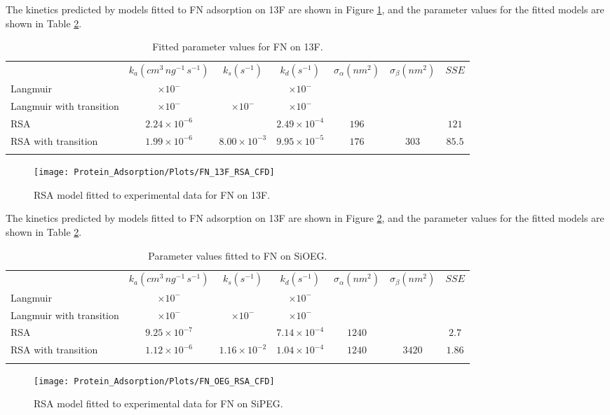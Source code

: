 The kinetics predicted by models fitted to FN adsorption on 13F are
shown in Figure \ref{fig:FN 13F fitted}, and the parameter values
for the fitted models are shown in Table \ref{tab:FN OEG fitted params}.%
\begin{table}
\caption{\label{tab:FN on 13F}Fitted parameter values for FN on 13F.}
\begin{tabular}{>{\raggedright}p{0.75in}cccccc}
 & $k_{a}\left(cm^{3}\, ng^{-1}\, s^{-1}\right)$ & $k_{s}\left(s^{-1}\right)$ & $k_{d}\left(s^{-1}\right)$ & $\sigma_{\alpha}\left(nm^{2}\right)$ & $\sigma_{\beta}\left(nm^{2}\right)$ & $SSE$\tabularnewline[\doublerulesep]
\cline{2-7} 
\noalign{\vskip\doublerulesep}
Langmuir & $\times10^{-}$ &  & $\times10^{-}$ & $ $ &  & $ $\tabularnewline
Langmuir with transition & $\times10^{-}$ & $\times10^{-}$ & $\times10^{-}$ & $ $ & $ $ & $ $\tabularnewline
\noalign{\vskip\doublerulesep}
RSA & $2.24\times10^{-6}$ &  & $2.49\times10^{-4}$ & $196$ &  & $121$\tabularnewline
\noalign{\vskip\doublerulesep}
RSA with transition & $1.99\times10^{-6}$ & $8.00\times10^{-3}$ & $9.95\times10^{-5}$ & $176$ & $303$ & $85.5$\tabularnewline
\noalign{\vskip\doublerulesep}
\end{tabular}%
\end{table}
%
\begin{figure}
\texttt{[image: Protein\_Adsorption/Plots/FN\_13F\_RSA\_CFD]}

\caption{\label{fig:FN 13F fitted}RSA model fitted to experimental data for
FN on 13F.}
%
\end{figure}


The kinetics predicted by models fitted to FN adsorption on 13F are
shown in Figure \ref{fig:FN OEG fitted}, and the parameter values
for the fitted models are shown in Table \ref{tab:FN OEG fitted params}.%
\begin{table}
\caption{\label{tab:FN OEG fitted params}Parameter values fitted to FN on
SiOEG.}
\begin{tabular}{>{\raggedright}p{0.75in}cccccc}
 & $k_{a}\left(cm^{3}\, ng^{-1}\, s^{-1}\right)$ & $k_{s}\left(s^{-1}\right)$ & $k_{d}\left(s^{-1}\right)$ & $\sigma_{\alpha}\left(nm^{2}\right)$ & $\sigma_{\beta}\left(nm^{2}\right)$ & $SSE$\tabularnewline[\doublerulesep]
\cline{2-7} 
\noalign{\vskip\doublerulesep}
Langmuir & $\times10^{-}$ &  & $\times10^{-}$ & $ $ &  & $ $\tabularnewline
Langmuir with transition & $\times10^{-}$ & $\times10^{-}$ & $\times10^{-}$ & $ $ & $ $ & $ $\tabularnewline
\noalign{\vskip\doublerulesep}
RSA & $9.25\times10^{-7}$ &  & $7.14\times10^{-4}$ & $1240$ &  & $2.7$\tabularnewline
\noalign{\vskip\doublerulesep}
RSA with transition & $1.12\times10^{-6}$ & $1.16\times10^{-2}$ & $1.04\times10^{-4}$ & $1240$ & $3420$ & $1.86$\tabularnewline
\noalign{\vskip\doublerulesep}
\end{tabular}%
\end{table}
%
\begin{figure}
\texttt{[image: Protein\_Adsorption/Plots/FN\_OEG\_RSA\_CFD]}

\caption{\label{fig:FN OEG fitted}RSA model fitted to experimental data for
FN on SiPEG.}
%
\end{figure}



